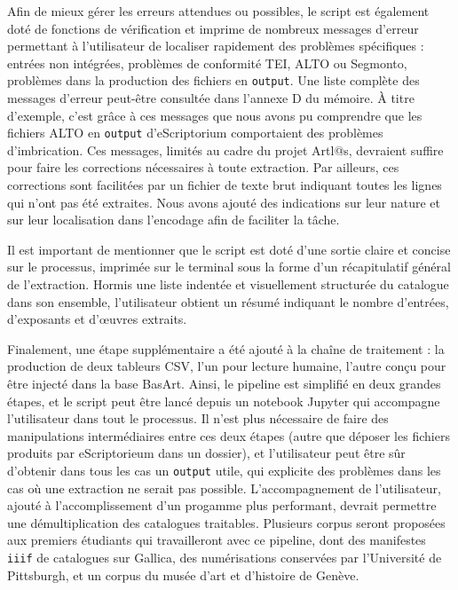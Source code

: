 \documentclass[a4paper,12pt,twoside]{book}
\begin{document}
Afin de mieux gérer les erreurs attendues ou possibles, le script est également doté de fonctions de vérification et imprime de nombreux messages d'erreur permettant à l'utilisateur de localiser rapidement des problèmes spécifiques : entrées non intégrées, problèmes de conformité TEI, ALTO ou Segmonto, problèmes dans la production des fichiers en \texttt{output}. Une liste complète des messages d'erreur peut-être consultée dans l'annexe D du mémoire. À titre d'exemple, c'est grâce à ces messages que nous avons pu comprendre que les fichiers ALTO en \texttt{output} d'eScriptorium comportaient des problèmes d'imbrication. Ces messages, limités au cadre du projet Artl@s, devraient suffire pour faire les corrections nécessaires à toute extraction. Par ailleurs, ces corrections sont facilitées par un fichier de texte brut indiquant toutes les lignes qui n'ont pas été extraites. Nous avons ajouté des indications sur leur nature et sur leur localisation dans l'encodage afin de faciliter la tâche.

Il est important de mentionner que le script est doté d'une sortie claire et concise sur le processus, imprimée sur le terminal sous la forme d'un récapitulatif général de l'extraction. Hormis une liste indentée et visuellement structurée du catalogue dans son ensemble, l'utilisateur obtient un résumé indiquant le nombre d'entrées, d'exposants et d'œuvres extraits.

Finalement, une étape supplémentaire a été ajouté à la chaîne de traitement : la production de deux tableurs CSV, l'un pour lecture humaine, l'autre conçu pour être injecté dans la base BasArt. Ainsi, le pipeline est simplifié en deux grandes étapes, et le script peut être lancé depuis un notebook Jupyter qui accompagne l'utilisateur dans tout le processus. Il n'est plus nécessaire de faire des manipulations intermédiaires entre ces deux étapes (autre que déposer les fichiers produits par eScriptorieum dans un dossier), et l'utilisateur peut être sûr d'obtenir dans tous les cas un \texttt{output} utile, qui explicite des problèmes dans les cas où une extraction ne serait pas possible. L'accompagnement de l'utilisateur, ajouté à l'accomplissement d'un progamme plus performant, devrait permettre une démultiplication des catalogues traitables. Plusieurs corpus seront proposées aux premiers étudiants qui travailleront avec ce pipeline, dont des manifestes \texttt{iiif} de catalogues sur Gallica, des numérisations conservées par l'Université de Pittsburgh, et un corpus du musée d'art et d'histoire de Genève. 
\end{document}
